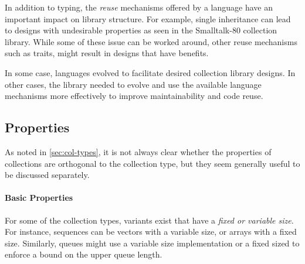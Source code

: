 \documentclass[sigconf, authorversion]{acmart}
\begin{document}
In addition to typing, the \emph{reuse} mechanisms offered by a language have
an important impact on library structure.
For example, single inheritance can lead to designs with undesirable
properties as seen in the Smalltalk-80 collection library\citep{Cook:1992:ISS}.
While some of these issue can be worked around,
other reuse mechanisms such as traits,
might result in designs that have benefits\citep{Black:2003:ATS}.

In some case, languages evolved to facilitate
desired collection library designs\citep{Chakravarty:2005:ATC,Garcia:2007}.
In other cases,
the library needed to evolve
and use the available language mechanisms more effectively
to improve maintainability and code reuse\citep{Odersky:2009}.



\subsection{Properties}
\label{sec:col-properties}

As noted in \cref{sec:col-types},
it is not always clear whether the properties of collections are orthogonal
to the collection type,
but they seem generally useful to be discussed separately.

\paragraph{Basic Properties}

For some of the collection types,
variants exist that have a \emph{fixed or variable size}.
For instance, sequences can be vectors with a variable size,
or arrays with a fixed size.
Similarly, queues might use a variable size implementation or a fixed sized to
enforce a bound on the upper queue length.
\end{document}
